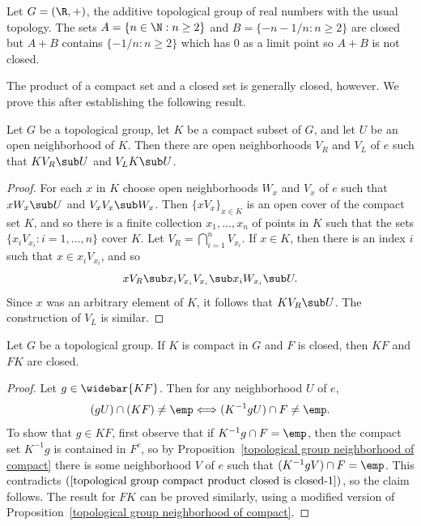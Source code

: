 \begin{example}
Let $G=(\R,+)$, the additive topological group of real numbers with the usual topology. The sets $A=\{n\in\N:n\geq 2\}$ and $B=\{-n-1/n:n\geq 2\}$ are closed but $A+B$ contains $\{-1/n:n\geq 2\}$ which has $0$ as a limit point so $A+B$ is not closed.
\end{example}
The product of a compact set and a closed set is generally closed, however. We prove this after establishing the following result.
\begin{proposition}\label{topological group neighborhood of compact}
Let $G$ be a topological group, let $K$ be a compact subset of $G$, and let $U$ be an open neighborhood of $K$. Then there are open neighborhoods $V_R$ and $V_L$ of $e$ such that $KV_R\sub U$ and $V_LK\sub U$.
\end{proposition}
\begin{proof}
For each $x$ in $K$ choose open neighborhoods $W_x$ and $V_x$ of $e$ such that $xW_x\sub U$ and $V_xV_x\sub W_x$. Then $\{xV_x\}_{x\in K}$ is an open cover of the compact set $K$, and so there is a finite collection $x_1,\dots,x_n$ of points in $K$ such that the sets $\{x_iV_{x_i}:i=1,\dots,n\}$ cover $K$. Let $V_R=\bigcap_{i=1}^{n}V_{x_i}$. If $x\in K$, then there is an index $i$ such that $x\in x_iV_{x_i}$, and so
\[xV_R\sub x_iV_{x_i}V_{x_i}\sub x_iW_{x_i}\sub U.\]
Since $x$ was an arbitrary element of $K$, it follows that $KV_R\sub U$. The construction of $V_L$ is similar.
\end{proof}
\begin{proposition}\label{topological group compact product closed is closed}
Let $G$ be a topological group. If $K$ is compact in $G$ and $F$ is closed, then $KF$ and $FK$ are closed.
\end{proposition}
\begin{proof}
Let $g\in\widebar{KF}$. Then for any neighborhood $U$ of $e$,
\begin{align}\label{topological group compact product closed is closed-1}
(gU)\cap(KF)\neq\emp\Longleftrightarrow(K^{-1}gU)\cap F\neq\emp.
\end{align}
To show that $g\in KF$, first observe that if $K^{-1}g\cap F=\emp$, then the compact set $K^{-1}g$ is contained in $F^{c}$, so by Proposition~\ref{topological group neighborhood of compact} there is some neighborhood $V$ of $e$ such that $(K^{-1}gV)\cap F=\emp$. This contradicts $(\ref{topological group compact product closed is closed-1})$, so the claim follows. The result for $FK$ can be proved similarly, using a modified version of Proposition~\ref{topological group neighborhood of compact}.
\end{proof}

